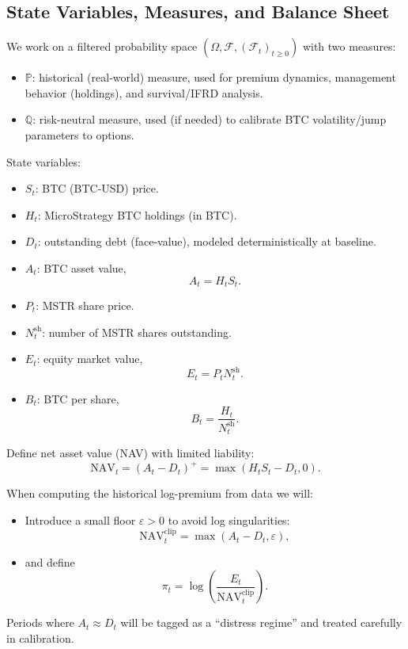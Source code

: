 \documentclass[11pt]{article}
\begin{document}
\subsection{State Variables, Measures, and Balance Sheet}

We work on a filtered probability space
$(\Omega,\mathcal F,(\mathcal F_t)_{t \ge 0})$
with two measures:
\begin{itemize}
  \item $\mathbb P$: historical (real-world) measure, used for premium dynamics, management behavior (holdings), and survival/IFRD analysis.
  \item $\mathbb Q$: risk-neutral measure, used (if needed) to calibrate BTC volatility/jump parameters to options.
\end{itemize}

State variables:
\begin{itemize}
  \item $S_t$: BTC (BTC-USD) price.
  \item $H_t$: MicroStrategy BTC holdings (in BTC).
  \item $D_t$: outstanding debt (face-value), modeled deterministically at baseline.
  \item $A_t$: BTC asset value,
  $$
    A_t = H_t S_t.
  $$
  \item $P_t$: MSTR share price.
  \item $N_t^{\text{sh}}$: number of MSTR shares outstanding.
  \item $E_t$: equity market value,
  $$
    E_t = P_t N_t^{\text{sh}}.
  $$
  \item $B_t$: BTC per share,
  $$
    B_t = \frac{H_t}{N_t^{\text{sh}}}.
  $$
\end{itemize}

Define net asset value (NAV) with limited liability:
$$
  \text{NAV}_t = (A_t - D_t)^+ = \max(H_t S_t - D_t, 0).
$$

When computing the historical log-premium from data we will:
\begin{itemize}
  \item Introduce a small floor $\varepsilon > 0$ to avoid log singularities:
  $$
    \text{NAV}_t^{\text{clip}} = \max(A_t - D_t, \varepsilon),
  $$
  \item and define
  $$
    \pi_t = \log\left(\frac{E_t}{\text{NAV}_t^{\text{clip}}}\right).
  $$
\end{itemize}
Periods where $A_t \approx D_t$ will be tagged as a ``distress regime'' and treated carefully in calibration.
\end{document}
